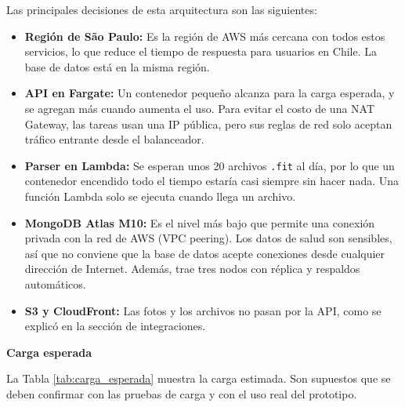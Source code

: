 Las principales decisiones de esta arquitectura son las siguientes:

\begin{itemize}
    \item \textbf{Región de São Paulo:} Es la región de AWS más cercana con todos estos servicios, lo que reduce el tiempo de respuesta para usuarios en Chile. La base de datos está en la misma región.
    \item \textbf{API en Fargate:} Un contenedor pequeño alcanza para la carga esperada, y se agregan más cuando aumenta el uso. Para evitar el costo de una NAT Gateway, las tareas usan una IP pública, pero sus reglas de red solo aceptan tráfico entrante desde el balanceador.
    \item \textbf{Parser en Lambda:} Se esperan unos 20 archivos \texttt{.fit} al día, por lo que un contenedor encendido todo el tiempo estaría casi siempre sin hacer nada. Una función Lambda solo se ejecuta cuando llega un archivo.
    \item \textbf{MongoDB Atlas M10:} Es el nivel más bajo que permite una conexión privada con la red de AWS (VPC peering). Los datos de salud son sensibles, así que no conviene que la base de datos acepte conexiones desde cualquier dirección de Internet. Además, trae tres nodos con réplica y respaldos automáticos.
    \item \textbf{S3 y CloudFront:} Las fotos y los archivos no pasan por la API, como se explicó en la sección de integraciones.
\end{itemize}

\textbf{Carga esperada}

La Tabla \ref{tab:carga_esperada} muestra la carga estimada. Son supuestos que se deben confirmar con las pruebas de carga y con el uso real del prototipo.

